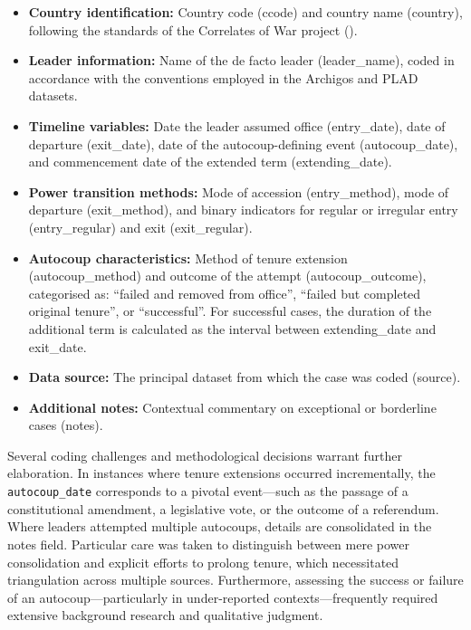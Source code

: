 \documentclass[
  12pt,
]{report}
\begin{document}
\begin{itemize}
\item
  \textbf{Country identification:} Country code (ccode) and country name
  (country), following the standards of the Correlates of War project
  ().
\item
  \textbf{Leader information:} Name of the de facto leader
  (leader\_name), coded in accordance with the conventions employed in
  the Archigos and PLAD datasets.
\item
  \textbf{Timeline variables:} Date the leader assumed office
  (entry\_date), date of departure (exit\_date), date of the
  autocoup-defining event (autocoup\_date), and commencement date of the
  extended term (extending\_date).
\item
  \textbf{Power transition methods:} Mode of accession (entry\_method),
  mode of departure (exit\_method), and binary indicators for regular or
  irregular entry (entry\_regular) and exit (exit\_regular).
\item
  \textbf{Autocoup characteristics:} Method of tenure extension
  (autocoup\_method) and outcome of the attempt (autocoup\_outcome),
  categorised as: ``failed and removed from office'', ``failed but
  completed original tenure'', or ``successful''. For successful cases,
  the duration of the additional term is calculated as the interval
  between extending\_date and exit\_date.
\item
  \textbf{Data source:} The principal dataset from which the case was
  coded (source).
\item
  \textbf{Additional notes:} Contextual commentary on exceptional or
  borderline cases (notes).
\end{itemize}

Several coding challenges and methodological decisions warrant further
elaboration. In instances where tenure extensions occurred
incrementally, the \texttt{autocoup\_date} corresponds to a pivotal
event---such as the passage of a constitutional amendment, a legislative
vote, or the outcome of a referendum. Where leaders attempted multiple
autocoups, details are consolidated in the notes field. Particular care
was taken to distinguish between mere power consolidation and explicit
efforts to prolong tenure, which necessitated triangulation across
multiple sources. Furthermore, assessing the success or failure of an
autocoup---particularly in under-reported contexts---frequently required
extensive background research and qualitative judgment.
\end{document}
